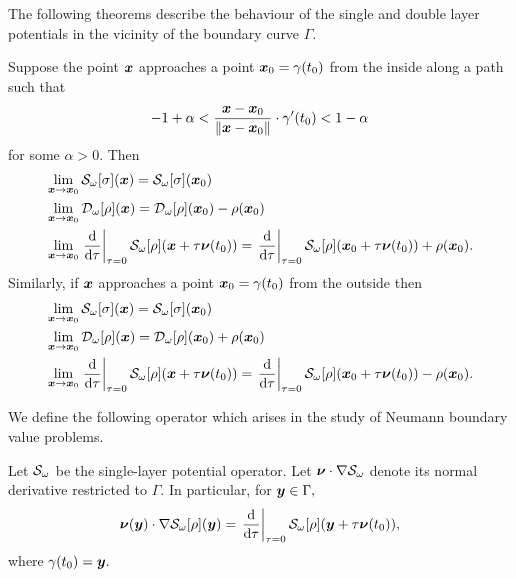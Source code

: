The following theorems describe the behaviour of the single and double layer potentials in the vicinity of the boundary curve $\Gamma.$

\begin{theorem}\label{thm:potlim}
Suppose the point $\boldsymbol{x}$ approaches a point $\boldsymbol{x}_0 = \gamma(t_0)$ from the inside along a path such that 
\begin{align}
-1+\alpha<\frac{\boldsymbol{x}-\boldsymbol{x}_0}{\|\boldsymbol{x}-\boldsymbol{x}_0\|} \cdot \gamma'(t_0) <1-\alpha
\end{align}
for some $\alpha >0.$ Then 
\begin{align}
&\lim_{\boldsymbol{x} \to \boldsymbol{x}_0} \mathcal{S}_{\omega}[\sigma](\boldsymbol{x}) = \mathcal{S}_{\omega}[\sigma](\boldsymbol{x}_0)\\
&\lim_{\boldsymbol{x} \to \boldsymbol{x}_0} \mathcal{D}_{\omega}[\rho](\boldsymbol{x}) = \mathcal{D}_{\omega}[\rho](\boldsymbol{x}_0)- \rho(\boldsymbol{x}_0)\\
&\lim_{\boldsymbol{x} \to \boldsymbol{x}_0} \left.\frac{{\rm d}}{{\rm d}\tau}\right|_{\tau= 0}\mathcal{S}_{\omega}[\rho](\boldsymbol{x}+\tau \boldsymbol{\nu}(t_0)) = \left.\frac{{\rm d}}{{\rm d}\tau}\right|_{\tau= 0}\mathcal{S}_{\omega}[\rho](\boldsymbol{x}_0+\tau \boldsymbol{\nu}(t_0))+ \rho(\boldsymbol{x}_0).
\end{align}
Similarly, if $\boldsymbol{x}$ approaches a point $\boldsymbol{x}_0 = \gamma(t_0)$ from the outside then
\begin{align}
&\lim_{\boldsymbol{x} \to \boldsymbol{x}_0} \mathcal{S}_{\omega}[\sigma](\boldsymbol{x}) = \mathcal{S}_{\omega}[\sigma](\boldsymbol{x}_0)\\
&\lim_{\boldsymbol{x} \to \boldsymbol{x}_0} \mathcal{D}_{\omega}[\rho](\boldsymbol{x}) = \mathcal{D}_{\omega}[\rho](\boldsymbol{x}_0)+ \rho(\boldsymbol{x}_0)\\
&\lim_{\boldsymbol{x} \to \boldsymbol{x}_0} \left.\frac{{\rm d}}{{\rm d}\tau}\right|_{\tau= 0}\mathcal{S}_{\omega}[\rho](\boldsymbol{x}+\tau \boldsymbol{\nu}(t_0)) = \left.\frac{{\rm d}}{{\rm d}\tau}\right|_{\tau= 0}\mathcal{S}_{\omega}[\rho](\boldsymbol{x}_0+\tau \boldsymbol{\nu}(t_0))- \rho(\boldsymbol{x}_0).
\end{align}
\end{theorem}

We define the following operator which arises in the study of Neumann boundary value problems.
\begin{definition}
Let $\mathcal{S}_{\omega}$ be the single-layer potential operator. Let $\boldsymbol{\nu}\cdot \nabla \mathcal{S}_{\omega}$  denote its normal derivative restricted to $\Gamma.$ In particular, for $\boldsymbol{y} \in \Gamma,$
\begin{align}
\boldsymbol{\nu}(\boldsymbol{y})\cdot \nabla \mathcal{S}_{\omega}[\rho] (\boldsymbol{y}) = \left.\frac{{\rm d}}{{\rm d}\tau}\right|_{\tau = 0} \mathcal{S}_{\omega}[\rho](\boldsymbol{y} + \tau \boldsymbol{\nu}(t_0)),
\end{align}
where $\gamma(t_0) = \boldsymbol{y}.$
\end{definition}

